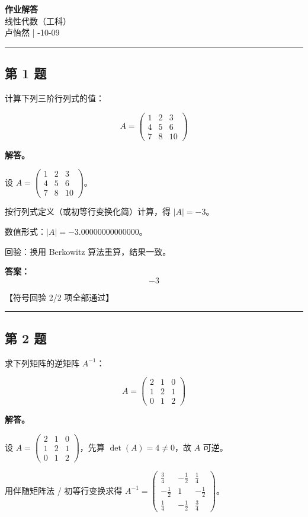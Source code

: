 \documentclass[12pt, a4paper]{article}
\newcommand{\problem}[1]{\subsection*{第 #1 题}}
\newcommand{\solution}{\textbf{解答。}}
\begin{document}
\begin{center}
    {\LARGE\bfseries 作业解答} \\[0.5em]
    {\large 线性代数（工科）} \\[0.3em]
    卢怡然 \quad | -10-09
\end{center}

\hrule
\vspace{1em}
\setlength{\parskip}{0.35em}
\problem{1}

计算下列三阶行列式的值：

$$
A = \begin{pmatrix} 1 & 2 & 3 \\ 4 & 5 & 6 \\ 7 & 8 & 10 \end{pmatrix}
$$

\solution

设 $A = \begin{pmatrix} 1 & 2 & 3 \\ 4 & 5 & 6 \\ 7 & 8 & 10 \end{pmatrix}$。

按行列式定义（或初等行变换化简）计算，得 $|A| = -3$。

数值形式：$|A| = -3.00000000000000$。

回验：换用 Berkowitz 算法重算，结果一致。

\textbf{答案：}
\[\boxed{-3}\]

\textcolor{okgreen}{【符号回验 2/2 项全部通过】}

\vspace{0.8em}
\hrule
\vspace{0.8em}

\problem{2}

求下列矩阵的逆矩阵 $A^{-1}$：

$$
A = \begin{pmatrix} 2 & 1 & 0 \\ 1 & 2 & 1 \\ 0 & 1 & 2 \end{pmatrix}
$$

\solution

设 $A = \begin{pmatrix} 2 & 1 & 0 \\ 1 & 2 & 1 \\ 0 & 1 & 2 \end{pmatrix}$，先算 $\det(A) = 4 \neq 0$，故 $A$ 可逆。

用伴随矩阵法 / 初等行变换求得 $A^{-1} = \begin{pmatrix} \frac{3}{4} & - \frac{1}{2} & \frac{1}{4} \\ - \frac{1}{2} & 1 & - \frac{1}{2} \\ \frac{1}{4} & - \frac{1}{2} & \frac{3}{4} \end{pmatrix}$。
\end{document}
